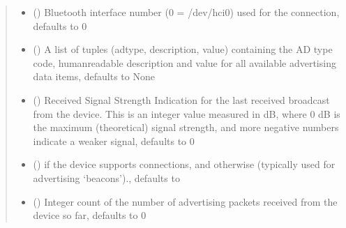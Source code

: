 \documentclass[letterpaper,10pt,english]{sphinxmanual}
\begin{document}
\begin{fulllineitems}
\begin{quote}
\begin{description}
\begin{itemize}
\item {} 
\sphinxAtStartPar
{} (\sphinxstyleliteralemphasis{\sphinxupquote{, }}) \textendash{} Bluetooth interface number (0 = /dev/hci0) used for the
connection, defaults to 0

\item {} 
\sphinxAtStartPar
{} (\sphinxstyleliteralemphasis{\sphinxupquote{, }}) \textendash{} A list of tuples (adtype, description, value) containing the
AD type code, human\sphinxhyphen{}readable description and value for all available
advertising data items, defaults to None

\item {} 
\sphinxAtStartPar
{} (\sphinxstyleliteralemphasis{\sphinxupquote{, }}) \textendash{} Received Signal Strength Indication for the last received
broadcast from the device. This is an integer value measured in dB,
where 0 dB is the maximum (theoretical) signal strength, and more
negative numbers indicate a weaker signal, defaults to 0

\item {} 
\sphinxAtStartPar
{} (\sphinxstyleliteralemphasis{\sphinxupquote{, }}) \textendash{}  if the device supports connections, and 
otherwise (typically used for advertising ‘beacons’).,
defaults to 

\item {} 
\sphinxAtStartPar
{} (\sphinxstyleliteralemphasis{\sphinxupquote{, }}) \textendash{} Integer count of the number of advertising packets
received from the device so far, defaults to 0

\end{itemize}

\end{description}\end{quote}


\end{fulllineitems}
\end{document}
